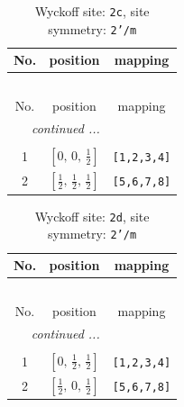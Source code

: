 \documentclass[fleqn,8pt]{jsarticle}
\begin{document}
\begin{longtable}{ccc}
\caption{Wyckoff site: {\tt 2c}, site symmetry: {\tt 2'/m}}
 \\
 \hline \hline
No. & position & mapping \\ \hline \endfirsthead

\multicolumn{2}{l}{\tablename\ \thetable{}} \\
 \hline \hline
No. & position & mapping \\ \hline \endhead

 \hline \hline
\multicolumn{2}{r}{\footnotesize\it continued ...} \\ \endfoot

 \hline \hline
\multicolumn{2}{r}{} \\ \endlastfoot

1 & $\left[ 0,\, 0,\, \frac{1}{2} \right]$ & {\tt [1,2,3,4]} \\ \hline
2 & $\left[ \frac{1}{2},\, \frac{1}{2},\, \frac{1}{2} \right]$ & {\tt [5,6,7,8]} \\
\end{longtable}
\renewcommand{\arraystretch}{1.2}
\begin{longtable}{ccc}
\caption{Wyckoff site: {\tt 2d}, site symmetry: {\tt 2'/m}}
 \\
 \hline \hline
No. & position & mapping \\ \hline \endfirsthead

\multicolumn{2}{l}{\tablename\ \thetable{}} \\
 \hline \hline
No. & position & mapping \\ \hline \endhead

 \hline \hline
\multicolumn{2}{r}{\footnotesize\it continued ...} \\ \endfoot

 \hline \hline
\multicolumn{2}{r}{} \\ \endlastfoot

1 & $\left[ 0,\, \frac{1}{2},\, \frac{1}{2} \right]$ & {\tt [1,2,3,4]} \\ \hline
2 & $\left[ \frac{1}{2},\, 0,\, \frac{1}{2} \right]$ & {\tt [5,6,7,8]} \\
\end{longtable}
\renewcommand{\arraystretch}{1.2}
\end{document}
